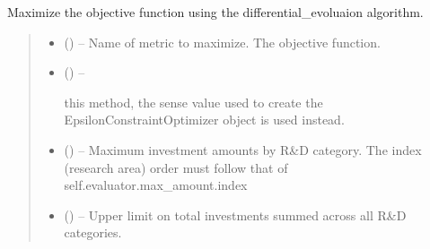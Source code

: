 \documentclass[letterpaper,10pt,english]{sphinxmanual}
\begin{document}
\begin{fulllineitems}

\begin{fulllineitems}
\label{\detokenize{tyche:tyche.EpsilonConstraints.EpsilonConstraintOptimizer.opt_diffev}}
\pysigstartsignatures
{}
\pysigstopsignatures
\sphinxAtStartPar
Maximize the objective function using the differential\_evoluaion algorithm.
\begin{quote}\begin{description}
\begin{itemize}
\item {} 
\sphinxAtStartPar
{} () – Name of metric to maximize. The objective function.

\item {} 
\sphinxAtStartPar
{} () – \begin{description}
\sphinxAtStartPar
this method, the sense value used to create the
EpsilonConstraintOptimizer object is used instead.

\end{description}


\item {} 
\sphinxAtStartPar
{} () – Maximum investment amounts by R\&D category. The index (research area)
order must follow that of self.evaluator.max\_amount.index

\item {} 
\sphinxAtStartPar
{} () – Upper limit on total investments summed across all R\&D categories.


\end{itemize}
\end{description}
\end{quote}
\end{fulllineitems}
\end{fulllineitems}
\end{document}
